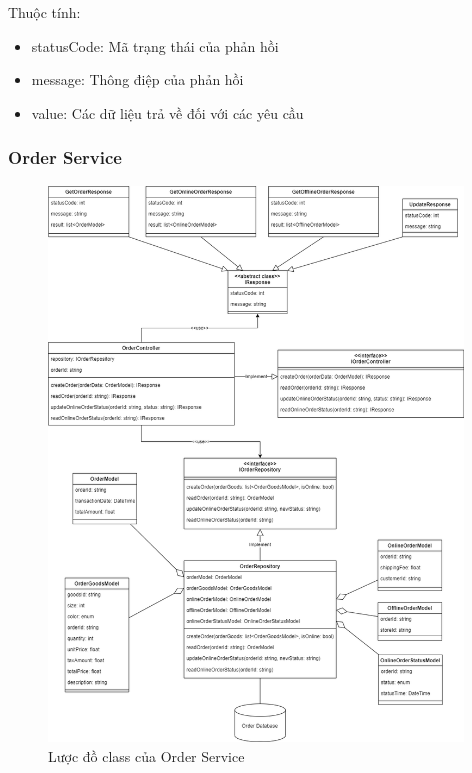 Thuộc tính:
\begin{itemize}
	\item statusCode: Mã trạng thái của phản hồi
	\item message: Thông điệp của phản hồi
	\item value: Các dữ liệu trả về đối với các yêu cầu
\end{itemize}

\subsubsection{Order Service}
\begin{figure}[!htp]
	\centering
	\includegraphics[width=11cm]{img/Architecture/service/OrderService.png}
	\newline
	\caption{Lược đồ class của Order Service}
\end{figure}



